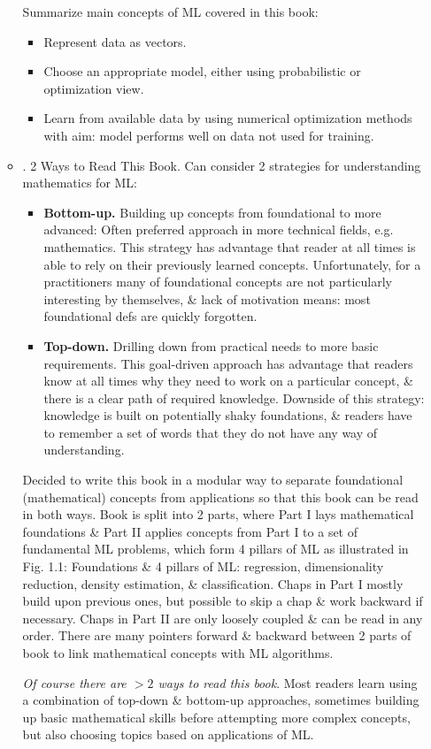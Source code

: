 \documentclass{article}
\begin{document}
\begin{itemize}
\begin{itemize}
		Summarize main concepts of ML covered in this book:
		\begin{itemize}
			\item Represent data as vectors.
			\item Choose an appropriate model, either using probabilistic or optimization view.
			\item Learn from available data by using numerical optimization methods with aim: model performs well on data not used for training.
		\end{itemize}
		\item {. 2 Ways to Read This Book.} Can consider 2 strategies for understanding mathematics for ML:
		\begin{itemize}
			\item {\bf Bottom-up.} Building up concepts from foundational to more advanced: Often preferred approach in more technical fields, e.g. mathematics. This strategy has advantage that reader at all times is able to rely on their previously learned concepts. Unfortunately, for a practitioners many of foundational concepts are not particularly interesting by themselves, \& lack of motivation means: most foundational defs are quickly forgotten.
			\item {\bf Top-down.} Drilling down from practical needs to more basic requirements. This goal-driven approach has advantage that readers know at all times why they need to work on a particular concept, \& there is a clear path of required knowledge. Downside of this strategy: knowledge is built on potentially shaky foundations, \& readers have to remember a set of words that they do not have any way of understanding.
		\end{itemize}
		Decided to write this book in a modular way to separate foundational (mathematical) concepts from applications so that this book can be read in both ways. Book is split into 2 parts, where Part I lays mathematical foundations \& Part II applies concepts from Part I to a set of fundamental ML problems, which form 4 pillars of ML as illustrated in {\sf Fig. 1.1: Foundations \& 4 pillars of ML}: regression, dimensionality reduction, density estimation, \& classification. Chaps in Part I mostly build upon previous ones, but possible to skip a chap \& work backward if necessary. Chaps in Part II are only loosely coupled \& can be read in any order. There are many pointers forward \& backward between 2 parts of book to link mathematical concepts with ML algorithms.
		
		{\it Of course there are $> 2$ ways to read this book}. Most readers learn using a combination of top-down \& bottom-up approaches, sometimes building up basic mathematical skills before attempting more complex concepts, but also choosing topics based on applications of ML.
		

\end{itemize}
\end{itemize}
\end{document}
